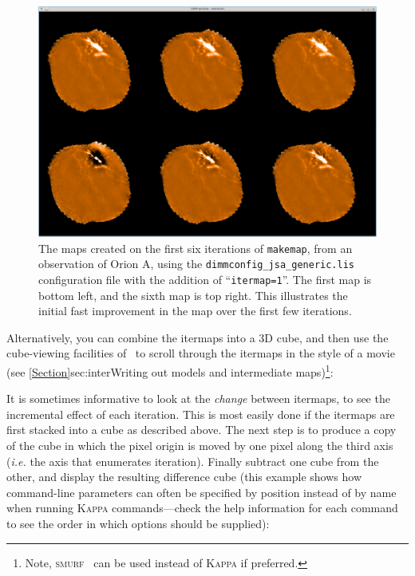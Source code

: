 \begin{terminalv}
\begin{figure}
\begin{center}
  \includegraphics[width=\linewidth]{sc21_itermaps}
\end{center}
\caption[Initial six itermaps]{\small The maps created on the first six
iterations of \texttt{makemap}, from an observation of Orion A, using the
\texttt{dimmconfig\_jsa\_generic.lis} configuration file with the addition
of ``\texttt{itermap=1}''. The first map is bottom left, and the sixth
map is top right. This illustrates the initial fast improvement
in the map over the first few iterations.}
\label{fig:itermaps}
\end{figure}

Alternatively, you can combine the itermaps into a 3D cube, and then use
the cube-viewing facilities of \gaia\ to scroll through the itermaps in the
style of a movie (see \cref{Section}{sec:inter}{Writing out models and
intermediate maps})\footnote{Note, \textsc{smurf} \stackframes\ can be used
instead of \textsc{Kappa}  if preferred.}:

\begin{terminalv}
\end{terminalv}

It is sometimes informative
to look at the \emph{change} between
itermaps, to see the incremental effect of each iteration. This is most
easily done if the itermaps are first stacked into a cube as described
above. The next step is to produce a copy of the cube in which the pixel
origin is moved by one pixel along the third axis (\emph{i.e.} the axis
that enumerates iteration). Finally subtract one cube from the other, and
display the resulting difference cube (this example shows how command-line
parameters can often be specified by position instead of by name when
running \textsc{Kappa} commands---check the help information for each
command to see the order in which options should be supplied):


\end{terminalv}
